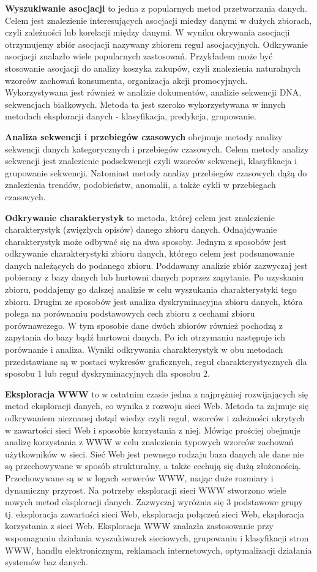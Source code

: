 \documentclass[twoside]{pracaMagisterskaMS}
\begin{document}
\textbf{Wyszukiwanie asocjacji} to jedna z popularnych metod przetwarzania danych. Celem jest znalezienie interesujących asocjacji miedzy danymi w dużych zbiorach, czyli zależności lub korelacji między danymi. W wyniku okrywania asocjacji otrzymujemy zbiór asocjacji nazywany zbiorem reguł asocjacyjnych. Odkrywanie asocjacji znalazło wiele popularnych zastosowań. Przykładem może być stosowanie asocjacji do analizy koszyka zakupów, czyli znalezienia naturalnych wzorców zachowań konsumenta, organizacja akcji promocyjnych. Wykorzystywana jest również w analizie dokumentów, analizie sekwencji DNA, sekwencjach białkowych. Metoda ta jest szeroko wykorzystywana w innych metodach eksploracji danych - klasyfikacja, predykcja, grupowanie.

\textbf{Analiza sekwencji i przebiegów czasowych} obejmuje metody analizy sekwencji danych kategorycznych i przebiegów czasowych. Celem metody analizy sekwencji jest znalezienie podsekwencji czyli wzorców sekwencji, klasyfikacja i grupowanie sekwencji. Natomiast metody analizy przebiegów czasowych dążą do znalezienia trendów, podobieństw, anomalii, a także cykli w przebiegach czasowych.

\textbf{Odkrywanie charakterystyk} to metoda, której celem jest znalezienie charakterystyk (zwięzłych opisów) danego zbioru danych. Odnajdywanie charakterystyk może odbywać się na dwa sposoby. Jednym z sposobów jest odkrywanie charakterystyki zbioru danych, którego celem jest podsumowanie danych należących do podanego zbioru. Poddawany analizie zbiór zazwyczaj jest pobierany z bazy danych lub hurtowni danych poprzez zapytanie. Po uzyskaniu zbioru, poddajemy go dalszej analizie w celu wyszukania charakterystyki tego zbioru. Drugim ze sposobów jest analiza dyskryminacyjna zbioru danych, która polega na porównaniu podstawowych cech zbioru z cechami zbioru porównawczego. W tym sposobie dane dwóch zbiorów również pochodzą z zapytania do bazy bądź hurtowni danych. Po ich otrzymaniu następuje ich porównanie i analiza.
Wyniki odkrywania charakterystyk w obu metodach przedstawiane są w postaci wykresów graficznych, reguł charakterystycznych dla sposobu 1 lub reguł dyskryminacyjnych dla sposobu 2. 

\textbf{Eksploracja WWW} to w ostatnim czasie jedna z najprężniej rozwijających się metod eksploracji danych, co wynika z rozwoju sieci Web. Metoda ta zajmuje się odkrywaniem nieznanej dotąd wiedzy czyli reguł, wzorców i zależności ukrytych w zawartości sieci Web i sposobie korzystania z niej. Mówiąc prościej obejmuje analizę korzystania z WWW w celu znalezienia typowych wzorców zachowań użytkowników w sieci. Sieć Web jest pewnego rodzaju baza danych ale dane nie są  przechowywane w sposób strukturalny, a także cechują się dużą złożonością. Przechowywane są w w logach serwerów WWW, mając duże rozmiary i dynamiczny przyrost. Na potrzeby eksploracji sieci WWW stworzono wiele nowych metod eksploracji danych. Zazwyczaj wyróżnia się 3 podstawowe grupy tj. eksploracja zawartości sieci Web, eksploracja połączeń sieci Web, eksploracja korzystania z sieci Web. Eksploracja WWW znalazła zastosowanie przy wspomaganiu działania wyszukiwarek sieciowych, grupowaniu i klasyfikacji stron WWW, handlu elektronicznym, reklamach internetowych, optymalizacji działania systemów baz danych.
\end{document}
